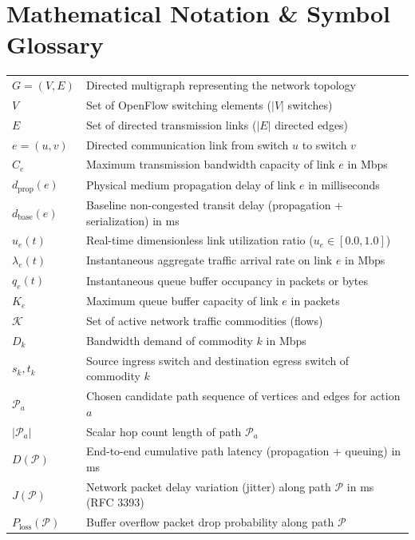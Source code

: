 \documentclass[12pt,a4paper,oneside]{report}
\begin{document}
\newpage

\chapter*{Mathematical Notation \& Symbol Glossary}

\begin{tabular}{ll}
$G = (V, E)$ & Directed multigraph representing the network topology \\
$V$ & Set of OpenFlow switching elements ($|V|$ switches) \\
$E$ & Set of directed transmission links ($|E|$ directed edges) \\
$e = (u, v)$ & Directed communication link from switch $u$ to switch $v$ \\
$C_e$ & Maximum transmission bandwidth capacity of link $e$ in Mbps \\
$d_{\text{prop}}(e)$ & Physical medium propagation delay of link $e$ in milliseconds \\
$d_{\text{base}}(e)$ & Baseline non-congested transit delay (propagation + serialization) in ms \\
$u_e(t)$ & Real-time dimensionless link utilization ratio ($u_e \in [0.0, 1.0]$) \\
$\lambda_e(t)$ & Instantaneous aggregate traffic arrival rate on link $e$ in Mbps \\
$q_e(t)$ & Instantaneous queue buffer occupancy in packets or bytes \\
$K_e$ & Maximum queue buffer capacity of link $e$ in packets \\
$\mathcal{K}$ & Set of active network traffic commodities (flows) \\
$D_k$ & Bandwidth demand of commodity $k$ in Mbps \\
$s_k, t_k$ & Source ingress switch and destination egress switch of commodity $k$ \\
$\mathcal{P}_a$ & Chosen candidate path sequence of vertices and edges for action $a$ \\
$|\mathcal{P}_a|$ & Scalar hop count length of path $\mathcal{P}_a$ \\
$D(\mathcal{P})$ & End-to-end cumulative path latency (propagation + queuing) in ms \\
$J(\mathcal{P})$ & Network packet delay variation (jitter) along path $\mathcal{P}$ in ms (RFC 3393) \\
$P_{\text{loss}}(\mathcal{P})$ & Buffer overflow packet drop probability along path $\mathcal{P}$ \\

\end{tabular}
\end{document}
